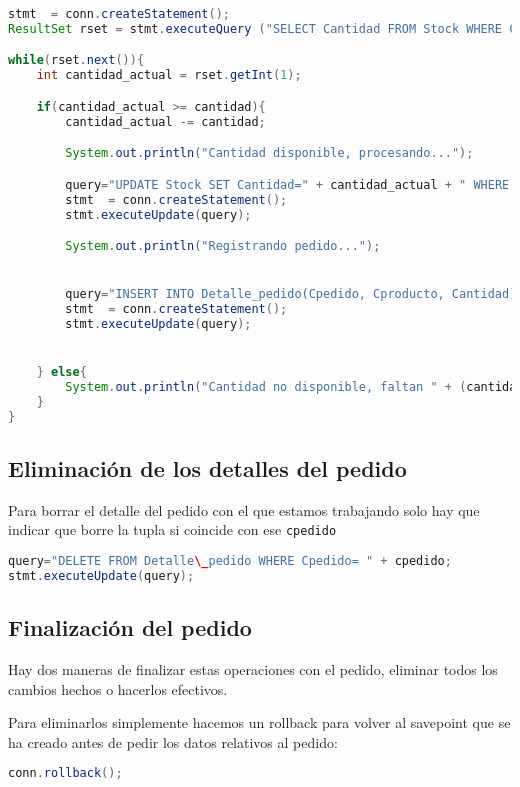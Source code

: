 \begin{lstlisting}[language=Java]
stmt  = conn.createStatement();
ResultSet rset = stmt.executeQuery ("SELECT Cantidad FROM Stock WHERE Cproducto='" + cproducto + "'");

while(rset.next()){
	int cantidad_actual = rset.getInt(1);

	if(cantidad_actual >= cantidad){
		cantidad_actual -= cantidad;

		System.out.println("Cantidad disponible, procesando...");

		query="UPDATE Stock SET Cantidad=" + cantidad_actual + " WHERE Cproducto='" + cproducto + "'";
		stmt  = conn.createStatement();
		stmt.executeUpdate(query);

		System.out.println("Registrando pedido...");


		query="INSERT INTO Detalle_pedido(Cpedido, Cproducto, Cantidad) VALUES ((SELECT CPedido FROM Pedido WHERE Cpedido='" + cpedido + "'), (SELECT Cproducto FROM Stock WHERE Cproducto='" + cproducto + "')," + cantidad + ")";
		stmt  = conn.createStatement();
		stmt.executeUpdate(query);


	} else{
		System.out.println("Cantidad no disponible, faltan " + (cantidad-cantidad_actual) + " unidades");
	}
}
\end{lstlisting}

\subsection{Eliminación de los detalles del pedido}

Para borrar el detalle del pedido con el que estamos trabajando solo hay que indicar que borre la tupla si coincide con ese \texttt{cpedido}

\begin{lstlisting}[language=Java]
query="DELETE FROM Detalle\_pedido WHERE Cpedido= " + cpedido;
stmt.executeUpdate(query);
\end{lstlisting}

\subsection{Finalización del pedido}

Hay dos maneras de finalizar estas operaciones con el pedido, eliminar todos los cambios hechos o hacerlos efectivos.

Para eliminarlos simplemente hacemos un rollback para volver al savepoint que se ha creado antes de pedir los datos relativos al pedido:
\begin{lstlisting}[language=Java]
conn.rollback();
\end{lstlisting}

